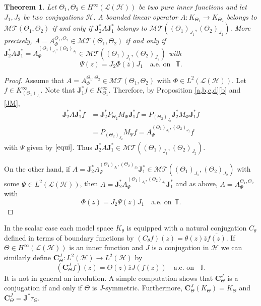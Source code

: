 \documentclass[11pt]{amsart}
\numberwithin{equation}{section}
\newcommand{\hsp}{\mathcal{H}}
\newcommand{\oL }{\mathcal{L}(\hsp) }
\newcommand{\C}{{\mathbf{C}}}
\newcommand{\J}{{\mathbf{J}}}
\newtheorem{theorem}{Theorem}[section]
\theoremstyle{definition}
\numberwithin{equation}{section}
\begin{document}
\begin{theorem}\label{4.4}
Let $\Theta_1,\Theta_2\in H^\infty(\oL)$ be two pure inner functions and let $J_1, J_2$ be two conjugations  $\hsp$. A bounded linear operator $A:K_{\Theta_1}\to K_{\Theta_2}$ belongs to $\mathcal{MT}(\Theta_1, \Theta_2)$ if and only if $\J_2^*A\J_1^*$ belongs to $\mathcal{MT}((\Theta_1)_{J_1}, (\Theta_2)_{J_2})$. More precisely, $A=A_\Phi^{\Theta_{1}, \Theta_2}\in \mathcal{MT}(\Theta_1, \Theta_2)$ if and only if
$\J_2^*A\J_1^*=A_\Psi^{(\Theta_{1})_{J_1}, (\Theta_2)_{J_2}}\in \mathcal{MT}((\Theta_1)_{J_1}, (\Theta_2)_{J_2})$ with
\begin{equation}\label{equi}
\Psi(z)=J_2\Phi(\overline{z})J_1 \quad\text{a.e. on } ~~\mathbb{T}.
\end{equation}
\end{theorem}
\begin{proof}
Assume that $A=A_\Phi^{\Theta_{1}, \Theta_2}\in\mathcal{MT}(\Theta_1, \Theta_2)$ with $\Phi\in L^2(\oL)$. Let $f\in K_{(\Theta_1)_{J_1}}^\infty$. Note that $\J_1^*f\in K_{\Theta_1}^\infty$. Therefore, by Proposition \ref{a,b,c,d}\eqref{b} and \eqref{JM},
\begin{align*}
\J_2^*A\J_1^* f
&=\J_2^*P_{\Theta_2}M_{\Phi}\J_1^*f=P_{(\Theta_2)_{J_2}}\J_2^*M_\Phi\J_1^*f\\
&=P_{(\Theta_2)_{J_2}}M_\Psi f=A_{\Psi}^{(\Theta_1)_{J_1},(\Theta_2)_{J_2}}f
\end{align*}
with $\Psi$ given by $\eqref{equi}$. Thus $\J_2^*A\J_1^*\in \mathcal{MT}((\Theta_1)_{J_1}, (\Theta_2)_{J_2})$.


 On the other hand, if
$A=\J_2^*A_\Psi^{(\Theta_{1})_{J_1}, (\Theta_2)_{J_2}}\J_1^*\in\mathcal{MT}((\Theta_1)_{J_1}, (\Theta_2)_{J_2})$  with some $\Psi\in L^2(\oL)$, then $A=\J_2^*A_{\Psi}^{(\Theta_1)_{J_1},(\Theta_2)_{J_2}}\J_1^* $ and as above, $A=A_{\Phi}^{\Theta_1,\Theta_2}$ with
$$\Phi(z)=J_2\Psi(z)J_1\quad \text{a.e. on}~~ \mathbb{T}.$$
\end{proof}

In the scalar case each model space $K_{\theta}$ is equipped with a natural conjugation $C_{\theta}$ defined in terms of boundary functions by
$(C_\theta f)(z)=\theta(z)\overline{z}\overline{f(z)}$. If $\Theta\in H^\infty(\oL)$ is an inner function and $J$ is a conjugation in $\hsp$ we can similarly define $\C_{\Theta}^J:L^2(\hsp)\to L^2(\hsp)$ by
$$(\C_{\Theta}^Jf)(z)=\Theta(z)\overline{z} J(f(z))\quad \text{a.e. on }~~\mathbb{T}.$$
It is not in general an involution. A simple computation shows that $\C_{\Theta}^J$ is a conjugation if and only if $\Theta$ is $J$-symmetric.
Furthermore,
$\C_{\Theta}^J(K_\Theta)=K_\Theta$ and
$\C_{\Theta}^J=\J^*\tau_\Theta.$
\end{document}
